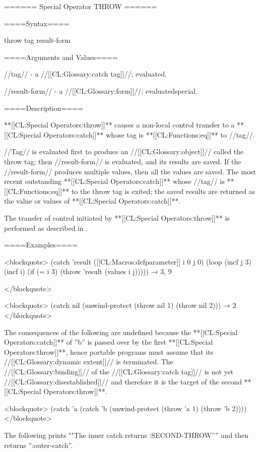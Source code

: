====== Special Operator THROW ======

====Syntax====

\DefspecNoReturn throw {tag result-form}

====Arguments and Values====

//tag// - a //[[CL:Glossary:catch tag]]//; evaluated.

//result-form// - a //[[CL:Glossary:form]]//; evaluatedspecial.

====Description====

**[[CL:Special Operators:throw]]** causes a non-local control transfer to a **[[CL:Special Operators:catch]]** whose tag is **[[CL:Functions:eq]]** to //tag//.

//Tag// is evaluated first to produce an //[[CL:Glossary:object]]// called the throw tag; then //result-form// is evaluated, and its results are saved. If the //result-form// produces multiple values, then all the values are saved. The most recent outstanding **[[CL:Special Operators:catch]]** whose //tag// is **[[CL:Functions:eq]]** to the throw tag is exited; the saved results are returned as the value or values of **[[CL:Special Operators:catch]]**.

The transfer of control initiated by **[[CL:Special Operators:throw]]** is performed as described in \secref\TransferOfControl.

====Examples====

<blockquote> (catch 'result ([[CL:Macros:defparameter]] i 0 j 0) (loop (incf j 3) (incf i) (if (= i 3) (throw 'result (values i j))))) → 3, 9

</blockquote>

<blockquote> (catch nil (unwind-protect (throw nil 1) (throw nil 2))) → 2 </blockquote>

The consequences of the following are undefined because the **[[CL:Special Operators:catch]]** of ''b'' is passed over by the first **[[CL:Special Operators:throw]]**, hence portable programs must assume that its //[[CL:Glossary:dynamic extent]]// is terminated. The //[[CL:Glossary:binding]]// of the //[[CL:Glossary:catch tag]]// is not yet //[[CL:Glossary:disestablished]]// and therefore it is the target of the second **[[CL:Special Operators:throw]]**.

<blockquote> (catch 'a (catch 'b (unwind-protect (throw 'a 1) (throw 'b 2)))) </blockquote>

The following prints ""The inner catch returns :SECOND-THROW'''' and then returns '':outer-catch''.


